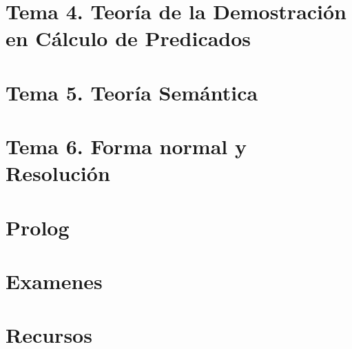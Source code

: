\documentclass[12pt, twoside, openright]{report} %
\begin{document}
\part{Tema 4. Teoría de la Demostración en Cálculo de Predicados}





\part{Tema 5. Teoría  Semántica}







\part{Tema 6. Forma normal y Resolución}






\part{Prolog}





\part{Examenes}











\part{Recursos}


\end{document}
